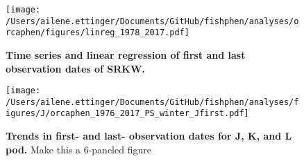 \documentclass{article}
\begin{document}
  \begin{figure}[p]
\texttt{[image: /Users/ailene.ettinger/Documents/GitHub/fishphen/analyses/orcaphen/figures/linreg\_1978\_2017.pdf]} 
\caption{\textbf{Time series and linear regression of first and last observation dates of SRKW.} }
 \label{fig:reg}
 \end{figure}
 

 
\begin{figure}[p]
\texttt{[image: /Users/ailene.ettinger/Documents/GitHub/fishphen/analyses/figures/J/orcaphen\_1976\_2017\_PS\_winter\_Jfirst.pdf]} 
\caption{\textbf{Trends in first- and last- observation dates for J, K, and L pod.} Make this a 6-paneled figure}
 \label{fig:trends}
 \end{figure}


\end{document}
